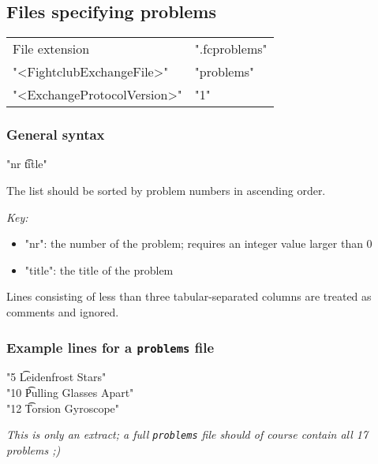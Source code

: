 \documentclass[11pt]{ltxdoc}
\begin{document}
    
    
    \subsection{Files specifying problems}
    \begin{center}
        \begin{tabular}{ll}
            File extension & ".fcproblems" \\
            "<FightclubExchangeFile>" & "problems" \\
            "<ExchangeProtocolVersion>" & "1"
        \end{tabular}
    \end{center}
    
    
    \subsubsection*{General syntax}
    \begin{center}
        "nr  \t  title"
    \end{center}

    The list should be sorted by problem numbers in ascending order.
    
    \bigskip
    \textit{Key:}
    \begin{itemize}
        \item "nr": the number of the problem; requires an integer value larger than 0
        \item "title": the title of the problem
    \end{itemize}
    
    \smallskip
    Lines consisting of less than three tabular-separated columns are treated as comments and ignored.
    
    
    \subsubsection*{Example lines for a \texttt{problems} file}
    "5   \t  Leidenfrost Stars" \\
    "10  \t  Pulling Glasses Apart" \\
    "12  \t  Torsion Gyroscope"
    
    \medskip
    \textit{This is only an extract; a full \texttt{problems} file should of course contain all 17 problems ;)}
    
    
    
    
    

    \clearpage
    \printindex
\end{document}
